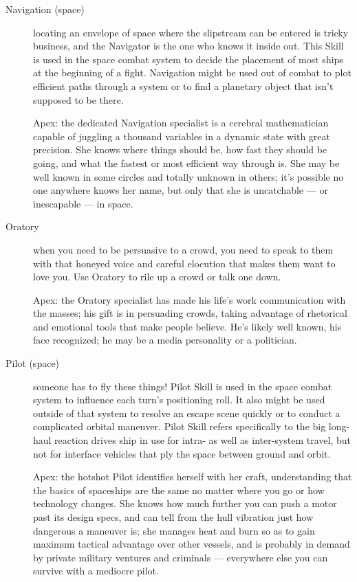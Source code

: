\begin{description}
\item[Navigation (space)]
locating an envelope of space where the slipstream can be entered is tricky business, and the Navigator is the one who knows it inside out. This Skill is used in the space combat system to decide the placement of most ships at the beginning of a fight. Navigation might be used out of combat to plot efficient paths through a system or to find a planetary object that isn't supposed to be there.

Apex: the dedicated Navigation specialist is a cerebral mathematician capable of juggling a thousand variables in a dynamic state with great precision. She knows where things should be, how fast they should be going, and what the fastest or most efficient way through is. She may be well known in some circles and totally unknown in others; it's possible no one anywhere knows her name, but only that she is uncatchable --- or inescapable --- in space.

\item[Oratory]
when you need to be persuasive to a crowd, you need to speak to them with that honeyed voice and careful elocution that makes them want to love you. Use Oratory to rile up a crowd or talk one down.

Apex: the Oratory specialist has made his life's work communication with the masses; his gift is in persuading crowds, taking advantage of rhetorical and emotional tools that make people believe. He's likely well known, his face recognized; he may be a media personality or a politician.

\item[Pilot (space)]
someone has to fly these things! Pilot Skill is used in the space combat system to influence each turn's positioning roll. It also might be used outside of that system to resolve an escape scene quickly or to conduct a complicated orbital maneuver. Pilot Skill refers specifically to the big long-haul reaction drives ship in use for intra- as well as inter-system travel, but not for interface vehicles that ply the space between ground and orbit.

Apex: the hotshot Pilot identifies herself with her craft, understanding that the basics of spaceships are the same no matter where you go or how technology changes. She knows how much further you can push a motor past its design specs, and can tell from the hull vibration just how dangerous a maneuver is; she manages heat and burn so as to gain maximum tactical advantage over other vessels, and is probably in demand by private military ventures and criminals --- everywhere else you can survive with a mediocre pilot.


\end{description}
